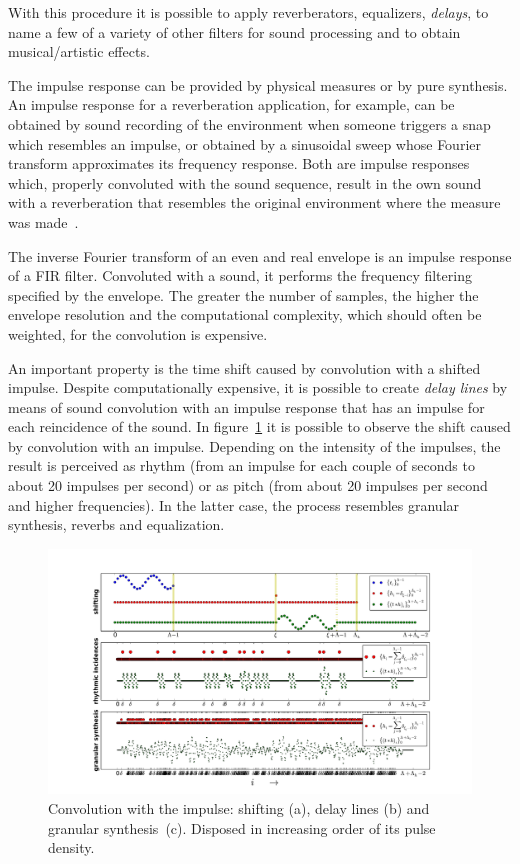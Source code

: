 \documentclass[
 aip,
 jmp,
 amsmath,amssymb,
 reprint,
]{revtex4-1}
\begin{document}
With this procedure it is possible to apply reverberators, equalizers, \emph{delays}, to name a few of a variety of other filters for sound processing and to obtain musical/artistic effects.

The impulse response can be provided by physical measures or by pure synthesis. An impulse response for a reverberation application, for example, can be obtained by sound recording of the environment when someone triggers a snap which resembles an impulse, or obtained by a sinusoidal sweep whose Fourier transform approximates its frequency response. Both are impulse responses which, properly convoluted with the sound sequence, result in the own sound with a reverberation that resembles the original environment where the measure was made~\cite{Cook}.

The inverse Fourier transform of an even and real envelope is an impulse response of a FIR filter. Convoluted with a sound, it performs the frequency filtering specified by the envelope. The greater the number of samples, the higher the envelope resolution and the computational complexity, which should often be weighted, for the convolution is expensive.

An important property is the time shift caused by convolution with a shifted impulse. Despite computationally expensive, it is possible to create \emph{delay lines} by means of sound convolution with an impulse response that has an impulse for each reincidence of the sound.
In figure~\ref{fig:delays} it is possible to observe the shift caused by convolution with an impulse. Depending on the intensity of the impulses, the result is perceived as rhythm (from an impulse for each couple of seconds to about 20 impulses per second) or as pitch (from about 20 impulses per second and higher frequencies). In the latter case, the process resembles granular synthesis, reverbs and equalization.

\begin{figure}[h!]
    \centering
        \includegraphics[width=\columnwidth]{figures/delays}
    \caption{Convolution with the impulse: shifting (a), delay lines (b) and granular synthesis~(c). Disposed in increasing order of its pulse density.}
        \label{fig:delays}
\end{figure}
\end{document}
